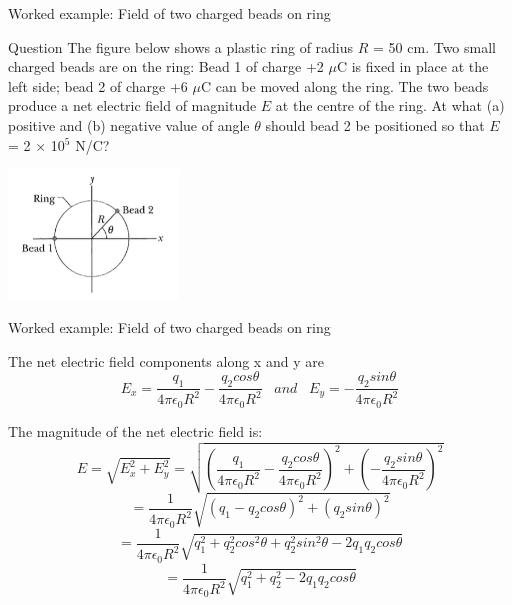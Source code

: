 {
\problemslide

\begin{frame}{Worked example: Field of two charged beads on ring}

\begin{blockexmplque}{Question}
  The figure below shows a plastic ring of radius $R$ = 50 cm.
  Two small charged beads are on the ring: Bead 1 of charge +2 $\mu$C
	is fixed in place at the left side;
	bead 2 of charge +6 $\mu$C can be moved along the ring.
	The two beads produce a net electric field of magnitude $E$ at the
	centre of the ring.
  At what (a) positive and (b) negative value of
	angle $\theta$ should bead 2 be positioned so that $E$ = 2 $\times$ 10$^{5}$ N/C?\\
  \begin{center}
      \includegraphics[width=0.34\textwidth]{./images/problems/lect01_ring_with_2_beads.png}
  \end{center}
\end{blockexmplque}

\end{frame}

%
%
%

\begin{frame}{Worked example: Field of two charged beads on ring}

  The net electric field components along x and y are
  \begin{equation*}
  	E_{x} = \frac{q_1}{4\pi\epsilon_0 R^2} - \frac{q_2 cos\theta}{4\pi\epsilon_0 R^2}
    \;\;\; and \;\;\;
  	E_{y} = - \frac{q_2 sin\theta}{4\pi\epsilon_0 R^2}
  \end{equation*}

  The magnitude of the net electric field is:
  \begin{equation*}
  	  E = \sqrt{E_{x}^2 + E_{y}^2} =
  		\sqrt{ (\frac{q_1}{4\pi\epsilon_0 R^2} - \frac{q_2 cos\theta}{4\pi\epsilon_0 R^2})^2 +
  					 (-\frac{q_2 sin\theta}{4\pi\epsilon_0 R^2})^2 }
  \end{equation*}
  \begin{equation*}
  		 = \frac{1}{4\pi\epsilon_0 R^2}
  			 \sqrt{ (q_1 - q_2 cos\theta)^2 + (q_2 sin\theta)^2 }
  \end{equation*}
  \begin{equation*}
  	    = \frac{1}{4\pi\epsilon_0 R^2}
  		    \sqrt{ q_1^2 + q_2^2 cos^2\theta + q_2^2 sin^2\theta - 2 q_1 q_2 cos\theta }
  \end{equation*}
  \begin{equation*}
  			= \frac{1}{4\pi\epsilon_0 R^2}
  			    \sqrt{ q_1^2 + q_2^2 - 2 q_1 q_2 cos\theta }
  \end{equation*}


\end{frame}}
